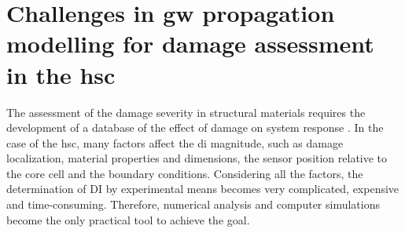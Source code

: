 \section{Challenges in \acs{gw} propagation modelling for damage assessment in the \acs{hsc}}
\label{sec:challenges}

The assessment of the damage severity in structural materials requires the development of a database of the effect of damage on system response \cite{worden2007fundamental}.
In the case of the \ac{hsc}, many factors affect the \ac{di} magnitude, such as damage localization, material properties and dimensions, the sensor position relative to the core cell and the boundary conditions.
Considering all the factors, the determination of DI by experimental means becomes very complicated, expensive and time-consuming.
Therefore, numerical analysis and computer simulations become the only practical tool to achieve the goal.

